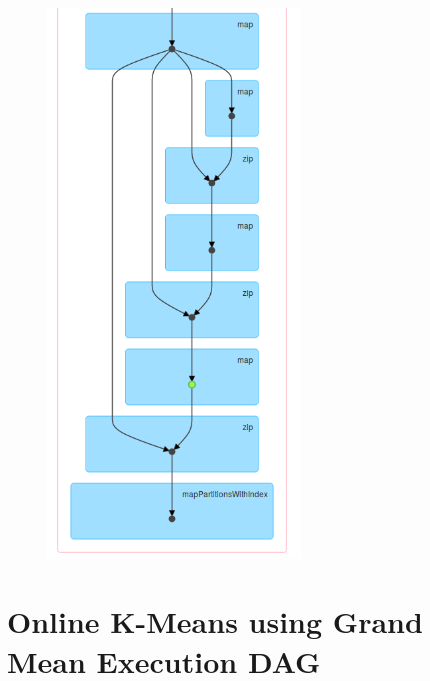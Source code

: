 \documentclass{l4proj}
\begin{document}
\begin{appendices}
\begin{figure}[H]
	\centering
    \includegraphics[width=0.60\textwidth]{images/DAG2}
    \label{fig:dag2}
\end{figure}

\section{Online K-Means using Grand Mean Execution DAG}


\end{appendices}
\end{document}
